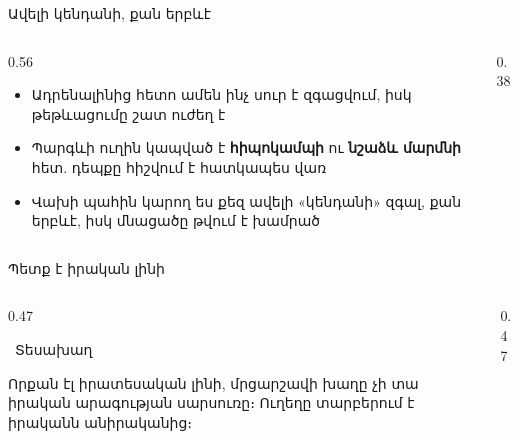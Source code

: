 \begin{frame}{Ավելի կենդանի, քան երբևէ}
  \begin{columns}[c]
    \begin{column}{0.56\textwidth}
      \begin{itemize}
        \item Ադրենալինից հետո ամեն ինչ սուր է զգացվում, իսկ թեթևացումը շատ ուժեղ է
        \item<2-> Պարգևի ուղին կապված է \textbf{հիպոկամպի} ու \textbf{նշաձև մարմնի} հետ. դեպքը հիշվում է հատկապես վառ
        \item<3-> Վախի պահին կարող ես քեզ ավելի «կենդանի» զգալ, քան երբևէ, իսկ մնացածը թվում է խամրած
      \end{itemize}
    \end{column}
    \begin{column}{0.38\textwidth}
      \centering
    \end{column}
  \end{columns}
\end{frame}

\begin{frame}{Պետք է իրական լինի}
  \begin{columns}[T]
    \begin{column}{0.47\textwidth}
      \begin{card}
        \ {\blackfont Տեսախաղ}\par\smallskip
        Որքան էլ իրատեսական լինի, մրցարշավի խաղը չի տա իրական արագության սարսուռը։ Ուղեղը տարբերում է իրականն անիրականից։
      \end{card}
    \end{column}
    \begin{column}{0.47\textwidth}
    \end{column}
  \end{columns}
  \vspace{3mm}
\end{frame}

